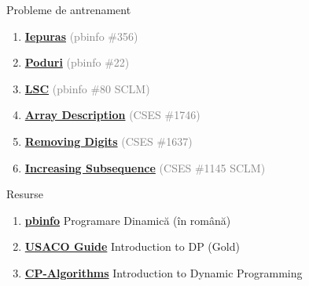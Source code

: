 \documentclass{beamer}
\begin{document}
\begin{frame}{Probleme de antrenament}
  \begin{enumerate}
    \item \href{https://www.pbinfo.ro/probleme/356/iepuras}{\textbf{Iepuras}}
          \textcolor{gray}{(pbinfo \#356)}
    \item \href{https://www.pbinfo.ro/probleme/22/poduri}{\textbf{Poduri}}
          \textcolor{gray}{(pbinfo \#22)}
    \item \href{https://www.pbinfo.ro/probleme/80/lsc}{\textbf{LSC}}
          \textcolor{gray}{(pbinfo \#80 \textemdash{} SCLM)}
    \item \href{https://cses.fi/problemset/task/1746}{\textbf{Array Description}}
          \textcolor{gray}{(CSES \#1746)}
    \item \href{https://cses.fi/problemset/task/1637}{\textbf{Removing Digits}}
          \textcolor{gray}{(CSES \#1637)}
    \item \href{https://cses.fi/problemset/task/1145}{\textbf{Increasing Subsequence}}
          \textcolor{gray}{(CSES \#1145 \textemdash{} SCLM)}
  \end{enumerate}
\end{frame}

\begin{frame}{Resurse}
  \begin{enumerate}
    \item \href{https://www.pbinfo.ro/articole/21/programare-dinamica}{\textbf{pbinfo}}
          \textemdash{} Programare Dinamică (în română)
    \item \href{https://usaco.guide/gold/intro-dp}{\textbf{USACO Guide}}
          \textemdash{} Introduction to DP (Gold)
    \item \href{https://cp-algorithms.com/dynamic_programming/intro-to-dp.html}{\textbf{CP-Algorithms}}
          \textemdash{} Introduction to Dynamic Programming
  \end{enumerate}
\end{frame}
\end{document}
